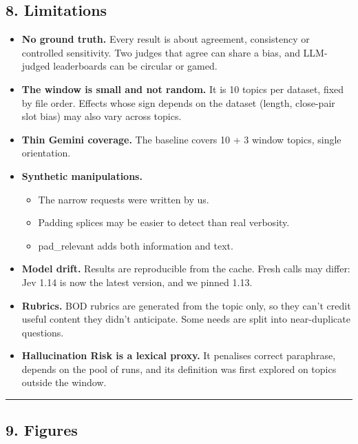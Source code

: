 \documentclass[
  10pt,
]{article}
\providecommand{\tightlist}{%
  \setlength{\itemsep}{0pt}\setlength{\parskip}{0pt}}
\begin{document}
\subsection{8. Limitations}\label{limitations}

\begin{itemize}
\tightlist
\item
  \textbf{No ground truth.} Every result is about agreement, consistency
  or controlled sensitivity. Two judges that agree can share a bias, and
  LLM-judged leaderboards can be circular or gamed.
\item
  \textbf{The window is small and not random.} It is 10 topics per
  dataset, fixed by file order. Effects whose sign depends on the
  dataset (length, close-pair slot bias) may also vary across topics.
\item
  \textbf{Thin Gemini coverage.} The baseline covers 10 + 3 window
  topics, single orientation.
\item
  \textbf{Synthetic manipulations.}

  \begin{itemize}
  \tightlist
  \item
    The narrow requests were written by us.
  \item
    Padding splices may be easier to detect than real verbosity.
  \item
    pad\_relevant adds both information and text.
  \end{itemize}
\item
  \textbf{Model drift.} Results are reproducible from the cache. Fresh
  calls may differ: Jev 1.14 is now the latest version, and we pinned
  1.13.
\item
  \textbf{Rubrics.} BOD rubrics are generated from the topic only, so
  they can't credit useful content they didn't anticipate. Some needs
  are split into near-duplicate questions.
\item
  \textbf{Hallucination Risk is a lexical proxy.} It penalises correct
  paraphrase, depends on the pool of runs, and its definition was first
  explored on topics outside the window.
\end{itemize}

\begin{center}\rule{0.5\linewidth}{0.5pt}\end{center}

\subsection{9. Figures}\label{figures}
\end{document}
